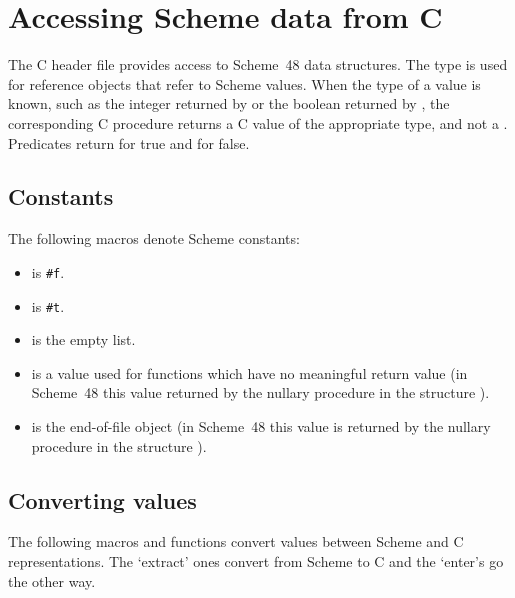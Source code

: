\section{Accessing Scheme data from C}
\label{sec:scheme-data}

The C header file  provides
 access to Scheme~48 data structures.
The type  is used for reference objects that 
 refer to Scheme values.
When the type of a value is known, such as the integer returned
 by  or the boolean returned by ,
 the corresponding C procedure returns a C value of the appropriate
 type, and not a .
Predicates return  for true and  for false.

\subsection{Constants}
\label{sec:constants}

The following macros denote Scheme constants:
%
\begin{itemize}
\item {} is \verb|#f|.
\item {} is \verb|#t|.
\item {} is the empty list.
\item {} is a value used for functions which have no
  meaningful return value
 (in Scheme~48 this value returned by the nullary procedure 
 in the structure ).
\item {} is the end-of-file object
 (in Scheme~48 this value is returned by the nullary procedure 
 in the structure ).
\end{itemize}

\subsection{Converting values}

The following macros and functions convert values between Scheme and C
 representations.
The `extract' ones convert from Scheme to C and the `enter's go the other
 way.

